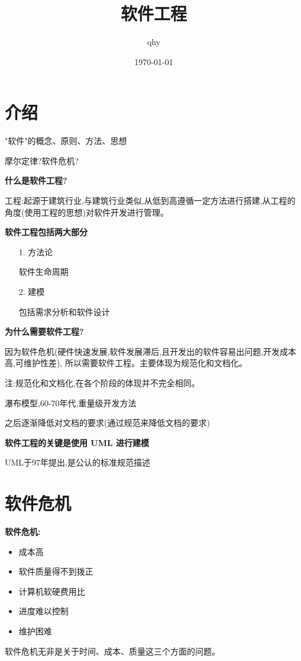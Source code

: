 \documentclass[UTF8,a4paper]{ctexart}
\author{ qhy }
\date{\today}
\title{软件工程}
\begin{document}
  \maketitle
  \tableofcontents
  \newpage

  \section{介绍}
  "软件"的概念、原则、方法、思想

  摩尔定律?软件危机?

  \textbf{什么是软件工程?}

  工程:起源于建筑行业,与建筑行业类似,从低到高遵循一定方法进行搭建,从工程的角度(使用工程的思想)对软件开发进行管理。

  \textbf{软件工程包括两大部分}
  \begin{itemize}
    \item [1.] 方法论

      软件生命周期
    \item [2.] 建模

      包括需求分析和软件设计
  \end{itemize}

  \textbf{为什么需要软件工程?}

  因为软件危机(硬件快速发展,软件发展滞后,且开发出的软件容易出问题,开发成本高,可维护性差),
  所以需要软件工程。主要体现为规范化和文档化。

  注:规范化和文档化,在各个阶段的体现并不完全相同。

  瀑布模型,60-70年代,重量级开发方法

  之后逐渐降低对文档的要求(通过规范来降低文档的要求)

  \textbf{软件工程的关键是使用 UML 进行建模}

  UML于97年提出,是公认的标准规范描述

  \section{软件危机}
  \textbf{软件危机:}
  \begin{itemize}
    \item 成本高
    \item 软件质量得不到拨正
    \item 计算机软硬费用比
    \item 进度难以控制
    \item 维护困难
  \end{itemize}

  软件危机无非是关于时间、成本、质量这三个方面的问题。
\end{document}
